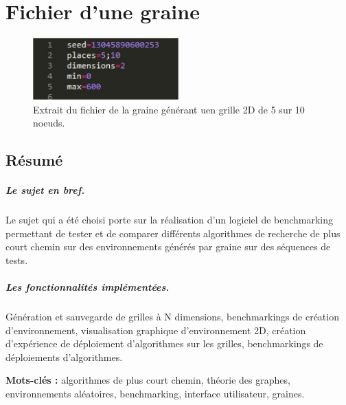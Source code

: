 \documentclass[pidr]{tnreport}
\begin{document}
\clearpage

\chapter{Fichier d'une graine}

\begin{figure}[H]
\centering
    \includegraphics[width=0.5\textwidth]{./figures/seed.jpg}
    \caption{Extrait du fichier de la graine générant uen grille 2D de 5 sur 10 noeuds.}
\end{figure}

\clearpage

\section*{Résumé}

\paragraph{Le sujet en bref.}
Le sujet qui a été choisi porte sur la réalisation d'un logiciel de benchmarking permettant de tester et de comparer différents algorithmes de recherche de plus court chemin sur des environnements générés par graine sur des séquences de tests. \newline

\paragraph{Les fonctionnalités implémentées.}

Génération et sauvegarde de grilles à N dimensions, benchmarkings de création d'environnement, visualisation graphique d'environnement 2D, création d'expérience de déploiement d'algorithmes sur les grilles, benchmarkings de déploiements d'algorithmes.

{\bf Mots-clés :} algorithmes de plus court chemin, théorie des graphes, environnements aléatoires, benchmarking, interface utilisateur, graines.
\end{document}
